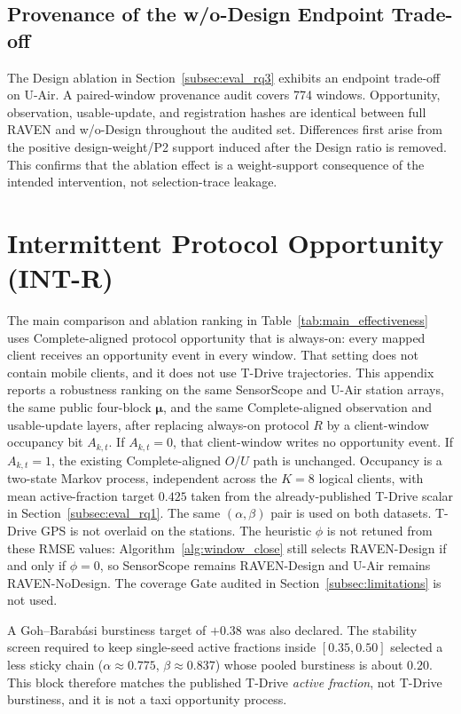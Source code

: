 \subsection{Provenance of the w/o-Design Endpoint Trade-off}
\label{app:design_provenance}

The Design ablation in Section~\ref{subsec:eval_rq3} exhibits an endpoint
trade-off on U-Air.  A paired-window provenance audit covers
774 windows.  Opportunity, observation, usable-update, and
registration hashes are identical between full RAVEN and w/o-Design throughout
the audited set.  Differences first arise from the positive design-weight/P2
support induced after the Design ratio is removed.  This confirms that the
ablation effect is a weight-support consequence of the intended intervention,
not selection-trace leakage.

\section{Intermittent Protocol Opportunity (INT-R)}
\label{app:int_r}

The main comparison and ablation ranking in Table~\ref{tab:main_effectiveness} uses
Complete-aligned protocol opportunity that is always-on: every mapped
client receives an opportunity event in every window.  That setting does
not contain mobile clients, and it does not use T-Drive trajectories.
This appendix reports a robustness ranking on the same SensorScope and
U-Air station arrays, the same public four-block $\boldsymbol\mu$, and the
same Complete-aligned observation and usable-update layers, after replacing
always-on protocol $R$ by a client-window occupancy bit $A_{k,t}$.
If $A_{k,t}=0$, that client-window writes no opportunity event.  If
$A_{k,t}=1$, the existing Complete-aligned $O$/$U$ path is unchanged.
Occupancy is a two-state Markov process, independent across the $K=8$
logical clients, with mean active-fraction target $0.425$ taken from the
already-published T-Drive scalar in Section~\ref{subsec:eval_rq1}.  The
same $(\alpha,\beta)$ pair is used on both datasets.  T-Drive GPS is not
overlaid on the stations.  The heuristic $\phi$ is not retuned from
these RMSE values: Algorithm~\ref{alg:window_close} still selects RAVEN-Design
if and only if $\phi=0$, so SensorScope remains RAVEN-Design and U-Air remains
RAVEN-NoDesign.
The coverage Gate audited in Section~\ref{subsec:limitations} is not used.

A Goh--Barab\'asi burstiness target of $+0.38$ was also declared.  The
stability screen required to keep single-seed active fractions inside
$[0.35,0.50]$ selected a less sticky chain
($\alpha\approx0.775$, $\beta\approx0.837$) whose pooled burstiness is
about $0.20$.  This block therefore matches the published T-Drive
\emph{active fraction}, not T-Drive burstiness, and it is not a taxi
opportunity process.

